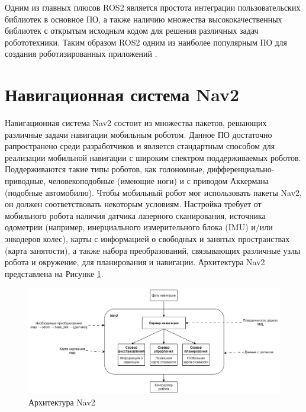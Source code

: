 Одним из главных плюсов ROS2 является простота интеграции пользовательских библиотек в основное ПО, а также наличию множества высококачественных библиотек с открытым исходным кодом для решения различных задач робототехники. Таким образом ROS2 одним из наиболее популярным ПО для создания роботизированных приложений \cite{macenski2022robot}.

\section{Навигационная система Nav2}
Навигационная система Nav2 состоит из множества пакетов, решающих различные задачи навигации мобильным роботом. Данное ПО достаточно рапространено среди разработчиков и является стандартным способом для реализации мобильной навигации с широким спектром поддерживаемых роботов. Поддерживаются такие типы роботов, как голономные, дифференциально-приводные, человекоподобные (имеющие ноги) и с приводом Аккермана (подобные автомобилю). Чтобы мобильный робот мог использовать пакеты Nav2, он должен соответствовать некоторым условиям. Настройка требует от мобильного робота наличия датчика лазерного сканирования, источника одометрии (например, инерциального измерительного блока (IMU) и/или энкодеров колес), карты с информацией о свободных и занятых пространствах (карта занятости), а также набора преобразований, связывающих различные узлы робота и окружение, для планирования и навигации. Архитектура Nav2 представлена на Рисунке \ref*{fig:nav2_arch}.

\begin{figure}[h]
    \centering
    \includegraphics[width=1.0\textwidth]{images/chap_2/nav2_arch.png}
    \caption{Архитектура Nav2}
    \label{fig:nav2_arch}
\end{figure}

